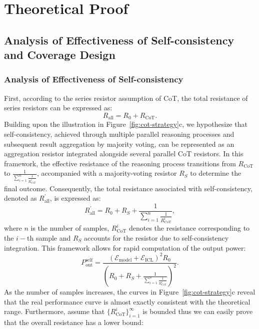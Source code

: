 \section{Theoretical Proof}
\subsection{Analysis of Effectiveness of Self-consistency and Coverage Design}
\label{append:proof-self}
\subsubsection{Analysis of Effectiveness of Self-consistency}
First, according to the series resistor assumption of CoT, the total resistance of series resistors can be expressed as:
\begin{equation}
    R_{\text{all}} = R_0 + R_{\text{CoT}}.
\end{equation}
Building upon the illustration in Figure~\ref{fig:cot-strategy}c, we hypothesize that self-consistency, achieved through multiple parallel reasoning processes and subsequent result aggregation by majority voting, can be represented as an aggregation resistor integrated alongside several parallel CoT resistors. In this framework, the effective resistance of the reasoning process transitions from  $R_{\text{CoT}}$ to $\frac{1}{\sum_{i=1}^n\frac{1}{R_{\text{CoT}}^i}}$, accompanied with a majority-voting resistor $R_S$ to determine the final outcome. Consequently, the total resistance associated with self-consistency, denoted as $R^{'}_{\text{all}}$, is expressed as:
\begin{equation}
    R^{'}_{\text{all}} = R_0 + R_S + \frac{1}{\sum_{i=1}^n\frac{1}{R_{\text{CoT}}^i}},\label{eq:r-all-self}
\end{equation}
where $n$ is the number of samples, \(R_{\text{CoT}}^i\) denotes the resistance corresponding to the \(i-\)th sample and $R_S$ accounts for the resistor due to self-consistency integration.
This framework allows for rapid computation of the output power:
\begin{equation}
    P^{\text{self}}_{\text{out}} = \frac{\left(\mathcal{E}_{\text{model}} + \mathcal{E}_{\text{ICL}}\right)^2 R_0}{(R_0+R_S + \frac{1}{\sum_{i=1}^n\frac{1}{R_{\text{CoT}}^i}})^2}.
\end{equation}
As the number of samples increases, the curves in Figure~\ref{fig:cot-strategy}c reveal that the real performance curve is almost exactly consistent with the theoretical range.
Furthermore, assume that \(\{R_{\text{CoT}}^i\}_{i=1}^\infty\) is bounded thus we can easily prove that the overall resistance has a lower bound:
